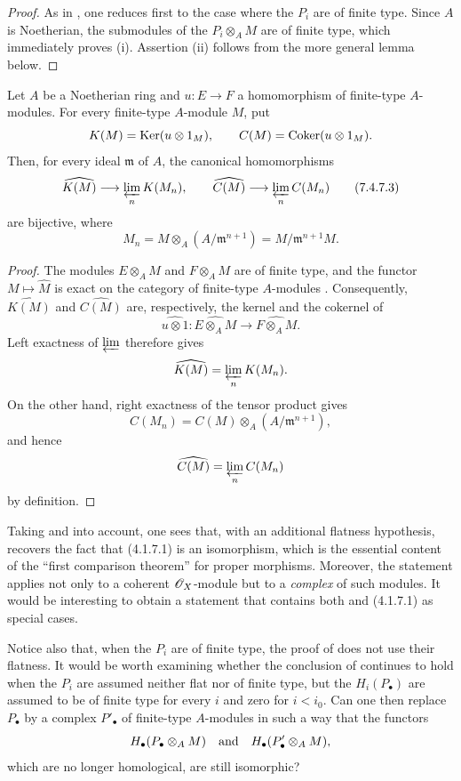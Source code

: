 \begin{proof}
As in , one reduces first to the case where the
$P_i$ are of finite type.  Since $A$ is Noetherian, the
submodules of the $P_i\otimes_A M$ are of finite type, which
immediately proves (i).  Assertion (ii) follows from the more
general lemma below.
\end{proof}

\begin{lemma}[7.4.7.2]
\label{III.7.4.7.2}
Let $A$ be a Noetherian ring and $u:E\to F$ a homomorphism of
finite-type $A$-modules.  For every finite-type $A$-module
$M$, put
\[
  K(M)=\operatorname{Ker}(u\otimes 1_M),
  \qquad
  C(M)=\operatorname{Coker}(u\otimes 1_M).
\]
Then, for every ideal $\mathfrak m$ of $A$, the canonical
homomorphisms
\[
  \widehat{K(M)}
  \longrightarrow
  \varprojlim_n K(M_n),
  \qquad
  \widehat{C(M)}
  \longrightarrow
  \varprojlim_n C(M_n)
  \tag{7.4.7.3}\label{III.7.4.7.3.eq}
\]
are bijective, where
\[
  M_n
  =
  M\otimes_A(A/\mathfrak m^{n+1})
  =
  M/\mathfrak m^{n+1}M.
\]
\end{lemma}

\begin{proof}
The modules $E\otimes_A M$ and $F\otimes_A M$ are of finite
type, and the functor $M\mapsto\widehat{M}$ is exact on the
category of finite-type $A$-modules .
Consequently, $\widehat{K(M)}$ and $\widehat{C(M)}$ are,
respectively, the kernel and the cokernel of
\[
  \widehat{u\otimes 1}:
  \widehat{E\otimes_A M}
  \longrightarrow
  \widehat{F\otimes_A M}.
\]
Left exactness of $\varprojlim$ therefore gives
\[
  \widehat{K(M)}
  =
  \varprojlim_n K(M_n).
\]
On the other hand, right exactness of the tensor product gives
\[
  C(M_n)
  =
  C(M)\otimes_A(A/\mathfrak m^{n+1}),
\]
and hence
\[
  \widehat{C(M)}
  =
  \varprojlim_n C(M_n)
\]
by definition.
\end{proof}

\begin{remark}[7.4.8]
\label{III.7.4.8}
Taking  and  into account,
one sees that, with an additional flatness hypothesis,
 recovers the fact that
(4.1.7.1) is an isomorphism, which is the
essential content of the ``first comparison theorem'' for
proper morphisms.  Moreover, the statement applies not only
to a coherent $\mathscr{O}_X$-module but to a \emph{complex} of
such modules.  It would be interesting to obtain a statement
that contains both  and
(4.1.7.1) as special cases.

Notice also that, when the $P_i$ are of finite type, the proof
of  does not use their flatness.  It would be
worth examining whether the conclusion of 
continues to hold when the $P_i$ are assumed neither flat nor
of finite type, but the $H_i(P_\bullet)$ are assumed to be of
finite type for every $i$ and zero for $i<i_0$.  Can one then
replace $P_\bullet$ by a complex $P'_\bullet$ of finite-type
$A$-modules in such a way that the functors
\[
  H_\bullet(P_\bullet\otimes_A M)
  \quad\hbox{and}\quad
  H_\bullet(P'_\bullet\otimes_A M),
\]
which are no longer homological, are still isomorphic?
\end{remark}
